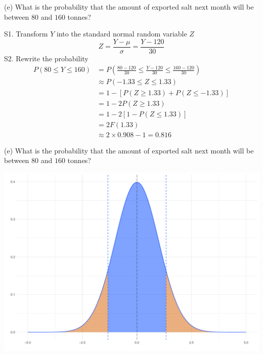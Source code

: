 \documentclass[
  11pt,
  ignorenonframetext,
]{beamer}
\begin{document}
\begin{frame}{(e) What is the probability that the amount of exported
salt next month will be between \(80\) and \(160\) tonnes?}
\protect\hypertarget{e-what-is-the-probability-that-the-amount-of-exported-salt-next-month-will-be-between-80-and-160-tonnes}{}
\normalsize

S1. Transform \(Y\) into the standard normal random variable \(Z\)
\small \[
Z = \frac{Y - \mu}{\sigma} = \frac{Y - 120}{30}
\] \normalsize S2. Rewrite the probability \small \[
\begin{aligned}
P(80 \leq Y \leq 160) &= P\left(\frac{80 - 120}{30} \leq \frac{Y - 120}{30} \leq \frac{160 - 120}{30}\right)\\
&\approx P\left(-1.33 \leq Z \leq 1.33\right)\\
&= 1 - [ P\left(Z \geq 1.33\right) + P\left(Z \leq -1.33\right)]\\
&= 1- 2P\left(Z \geq 1.33\right)\\
&= 1 -2[1-P\left(Z \leq 1.33\right)]\\
&= 2F(1.33)\\
& \approx 2 \times 0.908 -1 = 0.816
\end{aligned}
\]
\end{frame}

\begin{frame}{(e) What is the probability that the amount of exported
salt next month will be between \(80\) and \(160\) tonnes?}
\protect\hypertarget{e-what-is-the-probability-that-the-amount-of-exported-salt-next-month-will-be-between-80-and-160-tonnes-1}{}
\begin{center}\includegraphics[width=0.8\linewidth]{ECON1013_Tutorial2_files/figure-beamer/unnamed-chunk-6-1} \end{center}
\end{frame}
\end{document}
